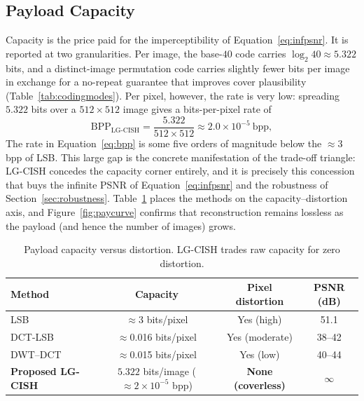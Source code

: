 \documentclass[10pt,a4paper]{article}
\theoremstyle{definition}
\begin{document}
\subsection{Payload Capacity}\label{sec:rescap}
Capacity is the price paid for the imperceptibility of Equation~\eqref{eq:infpsnr}.
It is reported at two granularities. Per image, the base-$40$ code carries
$\log_2 40\approx5.322$ bits, and a distinct-image permutation code carries slightly
fewer bits per image in exchange for a no-repeat guarantee that improves cover
plausibility (Table~\ref{tab:codingmodes}). Per pixel, however, the rate is very
low: spreading $5.322$ bits over a $512\times512$ image gives a bits-per-pixel rate
of
\begin{equation}
  \mathrm{BPP}_{\text{LG-CISH}}=\frac{5.322}{512\times512}\approx 2.0\times10^{-5}\ \text{bpp},
  \label{eq:bpp}
\end{equation}
The rate in Equation~\eqref{eq:bpp} is some five orders of magnitude below the
$\approx 3$\,bpp of LSB. This large gap is
the concrete manifestation of the trade-off triangle: LG-CISH concedes the capacity
corner entirely, and it is precisely this concession that buys the infinite PSNR of
Equation~\eqref{eq:infpsnr} and the robustness of Section~\ref{sec:robustness}.
Table~\ref{tab:capacity} places the methods on the capacity--distortion axis, and
Figure~\ref{fig:paycurve} confirms that reconstruction remains lossless as the
payload (and hence the number of images) grows.

\begin{table}[t]
\centering
\caption{Payload capacity versus distortion. LG-CISH trades raw capacity for zero distortion.}\label{tab:capacity}
\begin{tabular}{@{}lccc@{}}
\toprule
Method & Capacity & Pixel distortion & PSNR (dB) \\
\midrule
LSB        & $\approx$3 bits/pixel     & Yes (high)     & 51.1 \\
DCT-LSB    & $\approx$0.016 bits/pixel & Yes (moderate) & 38--42 \\
DWT--DCT   & $\approx$0.015 bits/pixel & Yes (low)      & 40--44 \\
\textbf{Proposed LG-CISH} & $5.322$ bits/image ($\approx2{\times}10^{-5}$ bpp) & \textbf{None (coverless)} & $\infty$ \\
\bottomrule
\end{tabular}
\end{table}
\end{document}
